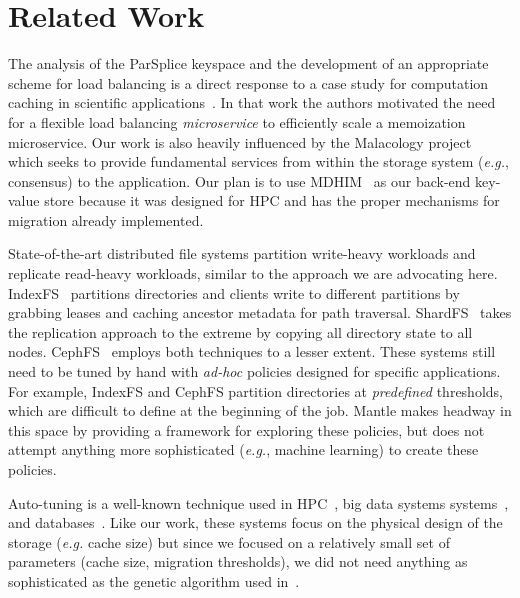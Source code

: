\section{Related Work}

The analysis of the ParSplice keyspace and the
development of an appropriate scheme for load balancing is a direct response to
a case study for computation caching in scientific
applications~\cite{jenkins:ipdsw17-mochi}. In that work the authors motivated
the need for a flexible load balancing \emph{microservice} to efficiently scale
a memoization microservice. Our work is also heavily influenced by the
Malacology project~\cite{sevilla:eurosys17-malacology} which seeks to provide
fundamental services from within the storage system ({\it e.g.}, consensus) to
the application.  Our plan is to use
MDHIM~\cite{greenberg:hotstorage2015-mdhim} as our back-end key-value store
because it was designed for HPC and has the proper mechanisms for migration
already implemented.  

State-of-the-art distributed file systems partition write-heavy workloads and
replicate read-heavy workloads, similar to the approach we are advocating here.
IndexFS~\cite{ren:sc2014-indexfs} partitions directories and clients write to
different partitions by grabbing leases and caching ancestor metadata for path
traversal. ShardFS~\cite{xiao:socc15-shardfs} takes the replication approach to
the extreme by copying all directory state to all nodes.
CephFS~\cite{weil:sc2004-dyn-metadata, weil:osdi2006-ceph} employs both
techniques to a lesser extent.  These systems still need to be tuned by hand
with {\it ad-hoc} policies designed for specific applications.  For example,
IndexFS and CephFS partition directories at \emph{predefined} thresholds,
which are difficult to define at the beginning of the job. Mantle makes headway
in this space by providing a framework for exploring these policies, but does
not attempt anything more sophisticated ({\it e.g.}, machine learning) to
create these policies. 

Auto-tuning is a well-known technique used in
HPC~\cite{behzad:sc2013-autotuning}, big data systems
systems~\cite{herodotou_starfish_2011}, and
databases~\cite{schnaitter_index_2009}.  Like our work, these systems focus on
the physical design of the storage ({\it e.g.} cache size) but since we focused
on a relatively small set of parameters (cache size, migration thresholds), we
did not need anything as sophisticated as the genetic algorithm used
in~\cite{behzad:sc2013-autotuning}.

